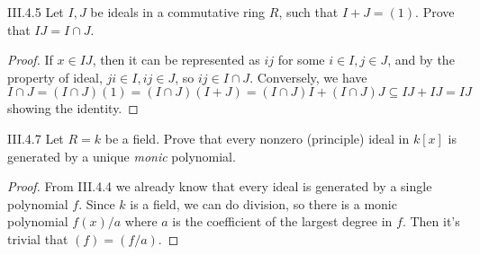 \begin{problem}{III.4.5}
Let $I, J$ be ideals in a commutative ring $R$, such that $I+J = (1)$. Prove that $IJ = I \cap J$.
\end{problem}
\begin{proof}
If $x \in IJ$, then it can be represented as $ij$ for some $i \in I, j \in J$, and by the property of ideal, $ji \in I, ij \in J$, so $ij \in I \cap J$. Conversely, we have
\[
I \cap J = (I \cap J) (1) = (I\cap J)(I+J) = (I \cap J)I + (I \cap J)J \subseteq IJ + IJ = IJ 
\]
showing the identity.
\end{proof}

\begin{problem}{III.4.7}
Let $R = k$ be a field. Prove that every nonzero (principle) ideal in $k[x]$ is generated by a unique \emph{monic} polynomial.
\end{problem}
\begin{proof}
From III.4.4 we already know that every ideal is generated by a single polynomial $f$. Since $k$ is a field, we can do division, so there is a monic polynomial $f(x)/a$ where $a$ is the coefficient of the largest degree in $f$. Then it's trivial that $(f) = (f/a)$.
\end{proof}

